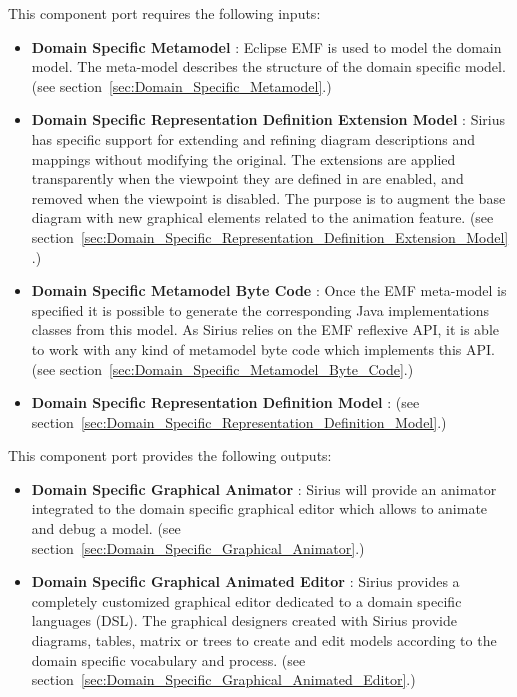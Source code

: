 \documentclass{gemoc} %
\begin{document}
This component port requires the following inputs:
\begin{itemize}
  \item \textbf{Domain Specific Metamodel} :
Eclipse EMF is used to model the domain model. The meta-model describes the structure of the domain specific model.
(see section~\ref{sec:Domain_Specific_Metamodel}.)
  \item \textbf{Domain Specific Representation Definition Extension Model} :
Sirius has specific support for extending and refining diagram descriptions and mappings without modifying the original. The extensions are applied transparently when the viewpoint they are defined in are enabled, and removed when the viewpoint is disabled.  The purpose is to augment the base diagram with new graphical elements related to the animation feature.
(see section~\ref{sec:Domain_Specific_Representation_Definition_Extension_Model}.)
  \item \textbf{Domain Specific Metamodel Byte Code} :
Once the EMF meta-model is specified it is possible to generate the corresponding Java implementations classes from this model. As Sirius relies on the EMF reflexive API, it is able to work with any kind of metamodel byte code which implements this API.
(see section~\ref{sec:Domain_Specific_Metamodel_Byte_Code}.)
  \item \textbf{Domain Specific Representation Definition Model} :
(see section~\ref{sec:Domain_Specific_Representation_Definition_Model}.)
\end{itemize}

This component port provides the following outputs:
\begin{itemize}
  \item \textbf{Domain Specific Graphical Animator} :
Sirius will provide an animator integrated to the domain specific graphical editor which allows to animate and debug a model. 
(see section~\ref{sec:Domain_Specific_Graphical_Animator}.)
  \item \textbf{Domain Specific Graphical Animated Editor} :
Sirius provides a completely customized graphical editor dedicated to a domain specific languages (DSL). The graphical designers created with Sirius provide diagrams, tables, matrix or trees to create and edit models according to the domain specific vocabulary and process.
(see section~\ref{sec:Domain_Specific_Graphical_Animated_Editor}.)
\end{itemize}
\end{document}
